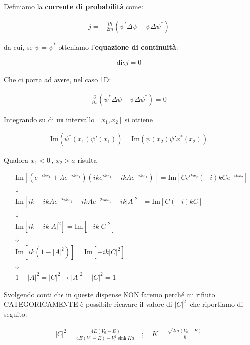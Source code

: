 Definiamo la \textbf{corrente di probabilità} come:

\begin{align}
j = -\frac{i\hbar}{2m}(\psi^*\Delta \psi - \psi \Delta \psi^*)
\end{align}

da cui, se $\psi=\psi^*$ otteniamo l'\textbf{equazione di continuità}:

\begin{align}
\text{div} j = 0
\end{align}

Che ci porta ad avere, nel caso 1D:

\begin{align}
\frac{\partial}{\partial x}(\psi^*\Delta \psi - \psi \Delta \psi^*)= 0
\end{align}


Integrando su di un intervallo $[x_1,x_2]$ si ottiene

\begin{align}
\text{Im}(\psi^*(x_1)\psi'(x_1))=\text{Im}(\psi(x_2)\psi'x^*(x_2))
\end{align}

Qualora $x_1 <0 \, ,\, x_2>a$ risulta

\begin{align}
{}&\text{Im}[(e^{-ikx_1} + Ae^{-ikx_1})   (ike^{ikx_1} -ikA e^{-ikx_1})] = \text{Im}[Ce^{ikx_2}(-i)kCe^{-ikx_2}] \nonumber \\
&\downarrow \nonumber \\
&\text{Im}[ik - ikA e^{-2ikx_1} + ikA e^{-2ikx_1} -ik |A|^2 ] = \text{Im}[C(-i)kC] \nonumber \\
&\downarrow \nonumber \\
& \text{Im}[ik -ik |A|^2 ] = \text{Im}[-ik|C|^2]\nonumber \\
&\downarrow \nonumber \\
& \text{Im}[ik(1 -|A|^2) ] = \text{Im}[-ik|C|^2]\nonumber \\
&\downarrow \nonumber \\
& 1- |A|^2=|C|^2 \rightarrow |A|^2+|C|^2=1
\end{align}


Svolgendo conti che in queste dispense NON faremo perché mi rifiuto CATEGORICAMENTE è possibile ricavare il valore di $|C|^2$, che riportiamo di seguito:

\begin{align}
|C|^2 = \frac{4E(V_0 - E)}{4E(V_0 - E) - V_0^2 \sinh{Ka}} \quad;\quad K= \frac{\sqrt{2m(V_0 - E)}}{\hbar}
\end{align}


